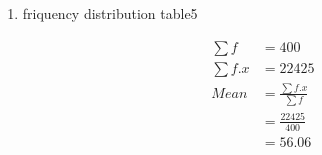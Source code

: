 \renewcommand{\theequation}{\theenumi}
\begin{enumerate}[label=\arabic*.,ref=\thesubsection.\theenumi]
\item \begin{table}[!ht]
	\centering
	
	\caption{friquency distribution table5 }
\end{table}
\begin{align}
\sum{f} &= 400
\\
\sum{f.x} &= 22425
\\
Mean &= \frac{\sum{f.x}}{\sum{f}}
\\ &= \frac{22425}{400}
\\&= 56.06
\end{align}
\end{enumerate}